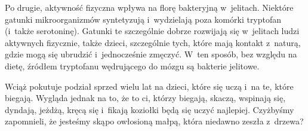 Po drugie, aktywność fizyczna wpływa na florę bakteryjną w~jelitach. Niektóre gatunki mikroorganizmów syntetyzują i~wydzielają poza komórki tryptofan (i~także serotoninę). Gatunki te szczególnie dobrze rozwijają się w~jelitach ludzi aktywnych fizycznie, także dzieci, szczególnie tych, które mają kontakt z~naturą, gdzie mogą się ubrudzić i~jednocześnie zmęczyć. W~ten sposób, bez względu na dietę, źródłem tryptofanu wędrującego do mózgu są bakterie jelitowe.

Wciąż pokutuje podział sprzed wielu lat na dzieci, które się uczą i~na te, które biegają. Wygląda jednak na to, że to ci, którzy  biegają, skaczą, wspinają się, dyndają, jeżdżą, kręcą się i~fikają koziołki będą się uczyć najlepiej. Czyżbyśmy zapomnieli, że jesteśmy skąpo owłosioną małpą, która niedawno zeszła z~drzewa?

 
\medskip
{}

\eject
